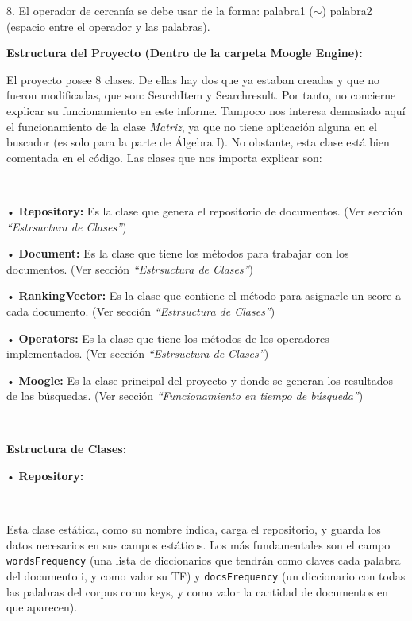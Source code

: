 \documentclass{article}
\begin{document}
8. El operador de cercanía se debe usar de la forma: palabra1 ($\sim $) palabra2 (espacio entre el
operador y las palabras).

\begin{center}
	\large\textbf{Estructura del Proyecto (Dentro de la carpeta Moogle Engine):}
\end{center}


El proyecto posee 8 clases. De ellas hay dos que ya estaban creadas y que no fueron modificadas,
que son: SearchItem y Searchresult. Por tanto, no concierne explicar su funcionamiento en este
informe. Tampoco nos interesa demasiado aquí el funcionamiento de la clase {\textit{Matriz}}, ya que no tiene
aplicación alguna en el buscador (es solo para la parte de Álgebra I). No obstante, esta clase está
bien comentada en el código. Las clases que nos importa explicar son:


\


• \textbf{Repository:} Es la clase que genera el repositorio de documentos. (Ver sección {\textit{“Estrsuctura de Clases”}})

• \textbf{Document:} Es la clase que tiene los métodos para trabajar con los documentos. (Ver sección
{\textit{“Estrsuctura de Clases”}})

• \textbf{RankingVector:} Es la clase que contiene el método para asignarle un score a cada
documento. (Ver sección {\textit{“Estrsuctura de Clases”}})

• \textbf{Operators:} Es la clase que tiene los métodos de los operadores implementados. (Ver sección
{\textit{“Estrsuctura de Clases”}})

• \textbf{Moogle:} Es la clase principal del proyecto y donde se generan los resultados de las
búsquedas. (Ver sección {\textit{“Funcionamiento en tiempo de búsqueda”}})


\ 


\begin{center}
	\large\textbf{Estructura de Clases:}
\end{center}


• \textbf{Repository:}


\


Esta clase estática, como su nombre indica, carga el repositorio, y guarda los datos necesarios
en sus campos estáticos. Los más fundamentales son el campo {\texttt{wordsFrequency}} (una lista de
diccionarios que tendrán como claves cada palabra del documento i, y como valor su TF) y
{\texttt{docsFrequency}} (un diccionario con todas las palabras del corpus como keys, y como valor la
cantidad de documentos en que aparecen).
\end{document}

